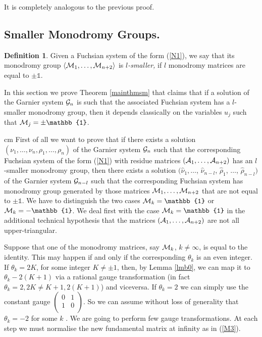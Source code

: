 \documentclass[12pt]{article}
\newcommand{\ID}{\mathbb{1}}
\theoremstyle{definition}
\newtheorem{df}{Definition}
\theoremstyle{theorem}
\begin{document}
 It is completely analogous to the previous 
proof.

\subsection{Smaller Monodromy Groups.}

\begin{df}
Given a Fuchsian system of the form (\ref{N1}), we say that its monodromy 
group $\langle {\cal M}_1,\dots,{\cal M}_{n+2}\rangle$ is 
{\it $l$-smaller,}\/ if $l$ monodromy matrices are equal to $\pm\ID$.
\end{df}


In this section we prove Theorem \ref{mainthmsm} that claims that
if a solution of the Garnier system ${\cal G}_{n}$ is such that 
the associated Fuchsian system has a $l$-smaller monodromy group, 
then it depends classically on the variables $u_j$ such that 
${\cal M}_j=\pm\ID$.



 cm
First of all we want to prove that if there exists a solution 
$(\nu_1,\dots,\nu_n,\rho_1,\dots,\rho_n)$
of the Garnier system ${\cal G}_{n}$ such that the corresponding 
Fuchsian system of the form (\ref{N1}) with residue matrices 
$({\cal A}_1,\dots,{\cal A}_{n+2})$ has an $l$-smaller monodromy 
group, then there exists a solution $(\hat\nu_1,\dots$, 
$\hat\nu_{n-l}$, $\hat\rho_1$, $\dots$, $\hat\rho_{n-l})$ of the 
Garnier system ${\cal G}_{n-l}$ such that the corresponding
Fuchsian system has monodromy group generated by those matrices 
${\cal M}_1,\dots,{\cal M}_{n+2}$ that are not equal to $\pm\ID$.
We have to distinguish the two cases ${\cal M}_k=\ID$ or 
${\cal M}_k=-\ID$. We deal first with the case ${\cal M}_k=\ID$
in the additional technical hypothesis that the matrices 
$({\cal A}_1,\dots,{\cal A}_{n+2})$ are not all upper-triangular.

Suppose that one of the monodromy matrices, say ${\cal M}_k$, 
$k\neq\infty$, is equal
to the identity. This may happen if and only if the corresponding 
$\theta_k$ is an even integer. If $\theta_k= 2 K$, for some integer 
$K\neq\pm 1$, then, by Lemma \ref{lmb0}, we can map it to
$\theta_k-2(K+1)$ via a rational gauge transformation (in fact 
$\theta_k=2,2 K\neq K+1,2(K+1)$) and viceversa.  If $\theta_k=2$ we 
can simply use the constant gauge
$\left(\begin{array}{cc}0&1\\ 1&0\\ \end{array}\right)$.  
So we can assume without loss of generality that $\theta_k=-2$ for 
some $k$ . We are going to perform few gauge transformations. At each 
step we must normalise the new fundamental matrix at infinity as in
(\ref{M3}).
\end{document}
